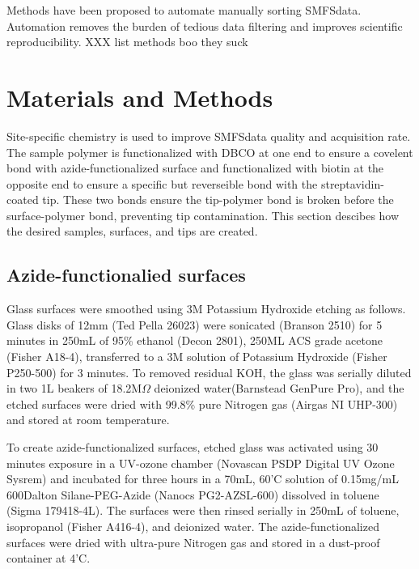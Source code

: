 \documentclass[%
  aip,12pt,tightenlines,
  amsthm,
 amsmath,amssymb,
 reprint,%
]{revtex4-1}
\newcommand{\sLabel}[1]{\label{section:#1}}
\newcommand{\firstp}[0]{\noindent}
\newcommand{\pl}[0]{\vspace{6pt}}
\newcommand{\supply}[2]{(#1 #2)}
\newcommand{\singlemol}[0]{SMFS}
\begin{document}
Methods have been proposed to automate manually sorting \singlemol data. Automation removes the burden of tedious data filtering and improves scientific reproducibility. XXX list methods boo they suck

\section{\sLabel{Materials}Materials and Methods}

Site-specific chemistry is used to improve \singlemol data quality and acquisition rate. The sample polymer is functionalized with DBCO at one end to ensure a covelent bond with azide-functionalized surface and functionalized with biotin at the opposite end to ensure a specific but reverseible bond with the streptavidin-coated tip. These two bonds ensure the tip-polymer bond is broken before the surface-polymer bond, preventing tip contamination. This section descibes how the desired samples, surfaces, and tips are created.

\subsection{\sLabel{Surface}Azide-functionalied surfaces}

\firstp Glass surfaces were smoothed using 3M Potassium Hydroxide etching as follows. Glass disks of 12mm \supply{Ted Pella}{26023} were sonicated \supply{Branson}{2510} for 5 minutes in 250mL of 95\% ethanol \supply{Decon}{2801}, 250ML ACS grade acetone \supply{Fisher}{A18-4}, transferred to a 3M solution of Potassium Hydroxide \supply{Fisher}{P250-500} for 3 minutes. To removed residual KOH, the glass was serially diluted in two 1L beakers of 18.2M$\Omega$ deionized water\supply{Barnstead}{GenPure Pro}, and the etched surfaces were dried with 99.8\% pure Nitrogen gas \supply{Airgas}{NI UHP-300} and stored at room temperature. \pl

To create azide-functionalized surfaces, etched glass was activated using 30 minutes exposure in a UV-ozone chamber \supply{Novascan}{PSDP Digital UV Ozone Sysrem} and incubated for three hours in a 70mL, 60'C solution of 0.15mg/mL 600Dalton Silane-PEG-Azide \supply{Nanocs}{PG2-AZSL-600} dissolved in toluene \supply{Sigma}{179418-4L}. The surfaces were then rinsed serially in 250mL of toluene, isopropanol \supply{Fisher}{A416-4}, and deionized water. The azide-functionalized surfaces were dried with ultra-pure Nitrogen gas and stored in a dust-proof container at 4'C. \pl 
\end{document}
